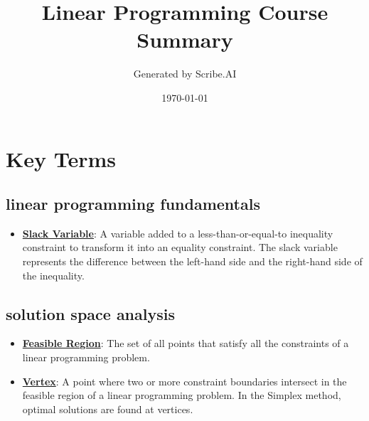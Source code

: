 \documentclass{article}%
\title{Linear Programming Course Summary}%
\author{Generated by Scribe.AI}%
\date{\today}%
\begin{document}
%
\normalsize%
\maketitle%
\section{Key Terms}%
\label{sec:KeyTerms}%
\subsection{linear programming fundamentals}%
\label{subsec:linearprogrammingfundamentals}%
\begin{itemize}[leftmargin=*]%
\item \href{https://www.math.purdue.edu/~yipn/421/2024-08-27-ExSimplex.pdf#page=1}{\textbf{Slack Variable}}: A variable added to a less-than-or-equal-to inequality constraint to transform it into an equality constraint. The slack variable represents the difference between the left-hand side and the right-hand side of the inequality.%
\end{itemize}

%
\subsection{solution space analysis}%
\label{subsec:solutionspaceanalysis}%
\begin{itemize}[leftmargin=*]%
\item \href{https://www.math.purdue.edu/~yipn/421/2024-08-27-ExSimplex.pdf#page=4}{\textbf{Feasible Region}}: The set of all points that satisfy all the constraints of a linear programming problem.%
\item \href{https://www.math.purdue.edu/~yipn/421/2024-08-27-ExSimplex.pdf#page=5}{\textbf{Vertex}}: A point where two or more constraint boundaries intersect in the feasible region of a linear programming problem. In the Simplex method, optimal solutions are found at vertices.%
\end{itemize}

%
\end{document}

